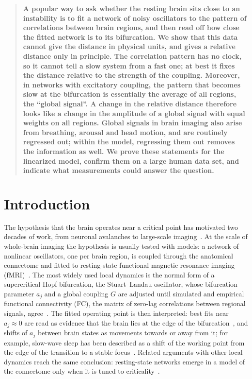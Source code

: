 \documentclass[aip,cha,reprint,amsmath,amssymb]{revtex4-2}
\theoremstyle{remark}
\begin{document}
\begin{quotation}
\noindent\textbf{%
A popular way to ask whether the resting brain sits close to an instability is to fit a network of noisy oscillators to the pattern of correlations between brain regions, and then read off how close the fitted network is to its bifurcation. We show that this data cannot give the distance in physical units, and gives a relative distance only in principle. The correlation pattern has no clock, so it cannot tell a slow system from a fast one; at best it fixes the distance relative to the strength of the coupling. Moreover, in networks with excitatory coupling, the pattern that becomes slow at the bifurcation is essentially the average of all regions, the ``global signal''. A change in the relative distance therefore looks like a change in the amplitude of a global signal with equal weights on all regions. Global signals in brain imaging also arise from breathing, arousal and head motion, and are routinely regressed out; within the model, regressing them out removes the information as well. We prove these statements for the linearized model, confirm them on a large human data set, and indicate what measurements could answer the question.}
\end{quotation}

\section{Introduction}\label{sec:intro}

The hypothesis that the brain operates near a critical point has motivated two decades of work, from neuronal avalanches to large-scale imaging~\cite{OByrne2022,Wilting2018}. At the scale of whole-brain imaging the hypothesis is usually tested with models: a network of nonlinear oscillators, one per brain region, is coupled through the anatomical connectome and fitted to resting-state functional magnetic resonance imaging (fMRI)~\cite{Cabral2011}. The most widely used local dynamics is the normal form of a supercritical Hopf bifurcation, the Stuart--Landau oscillator, whose bifurcation parameter $a_j$ and a global coupling $G$ are adjusted until simulated and empirical functional connectivity (FC), the matrix of zero-lag correlations between regional signals, agree~\cite{Deco2017dynamics,Deco2017single,PonceAlvarez2024}. The fitted operating point is then interpreted: best fits near $a_j\approx0$ are read as evidence that the brain lies at the edge of the bifurcation~\cite{Deco2017dynamics}, and shifts of $a_j$ between brain states as movements towards or away from it; for example, slow-wave sleep has been described as a shift of the working point from the edge of the transition to a stable focus~\cite{Jobst2017}. Related arguments with other local dynamics reach the same conclusion: resting-state networks emerge in a model of the connectome only when it is tuned to criticality~\cite{Haimovici2013}.
\end{document}

